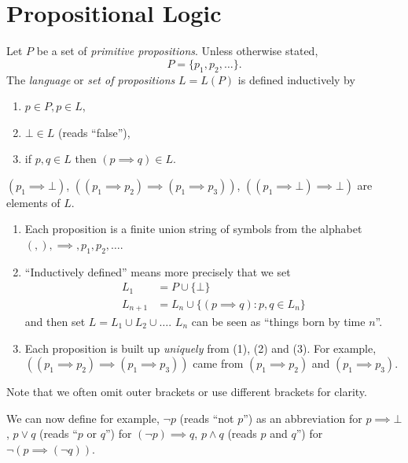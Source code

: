 \documentclass[a4paper]{article}
\begin{document}


\tableofcontents

\section{Propositional Logic}

Let \(P\) be a set of \emph{primitive propositions}. Unless otherwise stated,
\[
  P = \{p_1, p_2, \dots \}.
\]
The \emph{language} or \emph{set of propositions} \(L = L(P)\) is defined inductively by
\begin{enumerate}
\item \( p \in P, p \in L\),
\item \(\bot \in L\) (reads ``false''),
\item if \(p, q \in L\) then \((p \implies q) \in L\).
\end{enumerate}

\begin{eg}
  \((p_1 \implies \bot)\), \(((p_1 \implies p_2) \implies (p_1 \implies p_3))\), \(((p_1 \implies \bot) \implies \bot)\) are elements of \(L\).
\end{eg}

\begin{note}\leavevmode
  \begin{enumerate}
  \item Each proposition is a finite union string of symbols from the alphabet \((, ), \implies, p_1, p_2, \dots\).
  \item ``Inductively defined'' means more precisely that we set
    \begin{align*}
      L_1 &= P \cup \{\bot\} \\
      L_{n + 1} &= L_n \cup \{(p \implies q): p, q \in L_n\}
    \end{align*}
    and then set \(L = L_1 \cup L_2 \cup \dots\). \(L_n\) can be seen as ``things born by time \(n\)''.
  \item Each proposition is built up \emph{uniquely} from (1), (2) and (3). For example, \(((p_1 \implies p_2) \implies (p_1 \implies p_3))\) came from \((p_1 \implies p_2)\) and \((p_1 \implies p_3)\).
  \end{enumerate}
\end{note}

Note that we often omit outer brackets or use different brackets for clarity.

We can now define for example, \(\neg p\) (reads ``not \(p\)'') as an abbreviation for \(p \implies \bot\), \(p \lor q\) (reads ``\(p\) or \(q\)'') for \((\neg p) \implies q\), \(p \land q\) (reads \(p\) and \(q\)'') for \(\neg (p \implies (\neg q))\).
\end{document}
